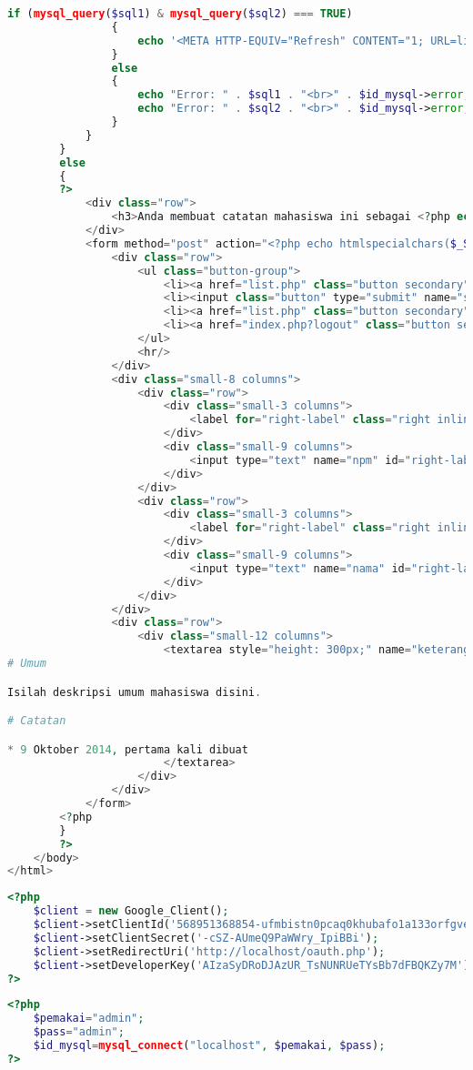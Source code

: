 \begin{lstlisting}[language=php,basicstyle=\tiny,caption=new.php]
				if (mysql_query($sql1) & mysql_query($sql2) === TRUE) 
				{
					echo '<META HTTP-EQUIV="Refresh" CONTENT="1; URL=list.php">';
				}
				else
				{
					echo "Error: " . $sql1 . "<br>" . $id_mysql->error;
					echo "Error: " . $sql2 . "<br>" . $id_mysql->error;
				}
			}
		}
		else
		{
		?>
			<div class="row">
				<h3>Anda membuat catatan mahasiswa ini sebagai <?php echo $_SESSION['email']?>.</h3>
			</div>
			<form method="post" action="<?php echo htmlspecialchars($_SERVER["PHP_SELF"]);?>">
				<div class="row">
					<ul class="button-group">
						<li><a href="list.php" class="button secondary">Kembali</a></li>
						<li><input class="button" type="submit" name="submit" value="Simpan"></li>
						<li><a href="list.php" class="button secondary">Menu Utama</a></li>
						<li><a href="index.php?logout" class="button secondary">Logout</a></li>
					</ul>
					<hr/>
				</div>
				<div class="small-8 columns">
					<div class="row">
						<div class="small-3 columns">
							<label for="right-label" class="right inline">NPM</label>
						</div>
						<div class="small-9 columns">
							<input type="text" name="npm" id="right-label" placeholder="Masukan NPM">
						</div>
					</div>
					<div class="row">
						<div class="small-3 columns">
							<label for="right-label" class="right inline">Nama</label>
						</div>
						<div class="small-9 columns">
							<input type="text" name="nama" id="right-label" placeholder="Masukan nama">
						</div>
					</div>
				</div>
				<div class="row">
					<div class="small-12 columns">
						<textarea style="height: 300px;" name="keterangan">
# Umum

Isilah deskripsi umum mahasiswa disini.

# Catatan

* 9 Oktober 2014, pertama kali dibuat
						</textarea>
					</div>
				</div>
			</form>
		<?php
		}
		?>
	</body>
</html>
\end{lstlisting}

\begin{lstlisting}[language=php,basicstyle=\tiny,caption=client.php]
<?php
	$client = new Google_Client();
	$client->setClientId('568951368854-ufmbistn0pcaq0khubafo1a133orfgve.apps.googleusercontent.com');
	$client->setClientSecret('-cSZ-AUmeQ9PaWWry_IpiBBi');
	$client->setRedirectUri('http://localhost/oauth.php'); 
	$client->setDeveloperKey('AIzaSyDRoDJAzUR_TsNUNRUeTYsBb7dFBQKZy7M');
?>
\end{lstlisting}

\begin{lstlisting}[language=php,basicstyle=\tiny,caption=configDatabase.php]
<?php
	$pemakai="admin";
	$pass="admin";
	$id_mysql=mysql_connect("localhost", $pemakai, $pass);
?>
\end{lstlisting}